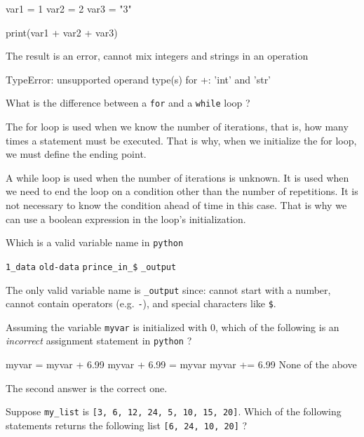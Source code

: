 \documentclass[12pt,a4paper]{exam}
\begin{document}
\begin{questions}
\begin{ipython}
var1 = 1
var2 = 2
var3 = "3"

print(var1 + var2 + var3)
\end{ipython}
\fillwithlines{3cm}
\begin{solution}
The result is an error, cannot mix integers and strings in an operation
\begin{ioutput}
TypeError: unsupported operand type(s) for +: 'int' and 'str'
\end{ioutput}
\end{solution}
\question
What is the difference between a \texttt{for} and a \texttt{while} loop ?
\fillwithlines{3cm}
\begin{solution}
The for loop is used when we know the number of iterations, that is, how many times a statement must be executed. That is why, when we initialize the for loop, we must define the ending point.

A while loop is used when the number of iterations is unknown. It is used when we need to end the loop on a condition other than the number of repetitions. It is not necessary to know the condition ahead of time in this case. That is why we can use a boolean expression in the loop's initialization.
\end{solution}
\question
Which is a valid variable name in \texttt{python} 

\begin{checkboxes}
\choice \texttt{1\_data}
\choice \texttt{old-data}
\choice \texttt{prince\_in\_\$}
\choice \texttt{\_output}
\end{checkboxes}
\begin{solution}
The only valid variable name is \texttt{\_output} since: cannot start with a number, cannot contain operators (e.g. \texttt{-}), and special characters like \texttt{\$}.
\end{solution}
\question
Assuming the variable \texttt{myvar} is initialized with 0, which of the following is an \emph{incorrect} assignment statement
in \texttt{python} ?

\begin{checkboxes}
\choice myvar = myvar + 6.99
\choice myvar + 6.99 = myvar
\choice myvar += 6.99
\choice None of the above
\end{checkboxes}
\begin{solution}
The second answer is the correct one.
\end{solution}
\question
Suppose \texttt{my\_list} is \texttt{[3, 6, 12, 24, 5, 10, 15, 20]}.
Which of the following statements returns the following list \texttt{[6, 24, 10, 20]} ?


\end{questions}
\end{document}
